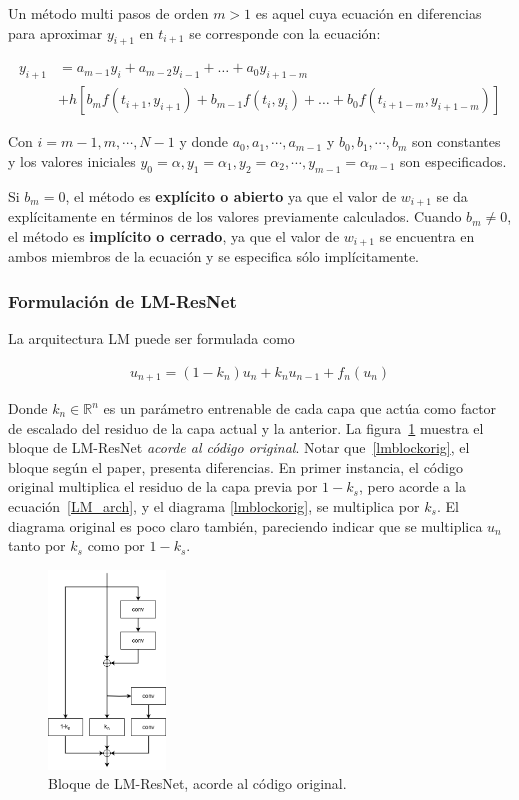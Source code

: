\documentclass[titlepage,a4paper,oneside]{article}
\begin{document}
Un método multi pasos de orden $m > 1$ es aquel cuya ecuación en diferencias para aproximar $y_{i+1}$ en $t_{i+1}$ se corresponde con la ecuación:

\begin{align}
	y_{i+1} &= a_{m-1} y_i + a_{m-2} y_{i-1} + \ldots + a_0 y_{i+1-m} \\
	        &+ h \left[b_m f(t_{i+1}, y_{i+1}) + b_{m-1} f(t_i, y_i) + \ldots + b_0 f(t_{i+1-m}, y_{i+1-m})  \right]
\end{align}

Con $i=m-1, m, \cdots, N-1$ y donde $a_0, a_1, \cdots, a_{m-1}$ y $b_0, b_1, \cdots, b_m$ son constantes y los valores iniciales $y_0 = \alpha, y_1 = \alpha_1, y_2 = \alpha_2, \cdots, y_{m-1} = \alpha_{m-1}$ son especificados.

Si $b_m = 0$, el método es \textbf{explícito o abierto} ya que el valor de $w_{i+1}$ se da explícitamente en términos de los valores previamente calculados. Cuando $b_m \neq 0$, el método es \textbf{implícito o cerrado}, ya que el valor de $w_{i+1}$ se encuentra en ambos miembros de la ecuación y se especifica sólo implícitamente.

\subsubsection{Formulación de LM-ResNet}
La arquitectura LM puede ser formulada como

\begin{align}\label{LM_arch}
	u_{n+1} = (1-k_n) u_n + k_n u_{n-1} + f_n(u_n)
\end{align}

Donde $k_n \in \mathbb{R}^n$ es un parámetro entrenable de cada capa que actúa como factor de escalado del residuo de la capa actual y la anterior. La figura~\ref{lmblock} muestra el bloque de LM-ResNet \textit{acorde al código original}. Notar que~\ref{lmblockorig}, el bloque según el paper, presenta diferencias. En primer instancia, el código original multiplica el residuo de la capa previa por $1-k_s$, pero acorde a la ecuación~\ref{LM_arch}, y el diagrama \ref{lmblockorig}, se multiplica por $k_s$. El diagrama original es poco claro también, pareciendo indicar que se multiplica $u_n$ tanto por $k_s$ como por $1-k_s$.

\begin{figure}[H]
\centering
\includegraphics[height=200px]{images/LM-Block.png}
\caption{Bloque de LM-ResNet, acorde al código original.}
\label{lmblock}
\end{figure}
\end{document}
